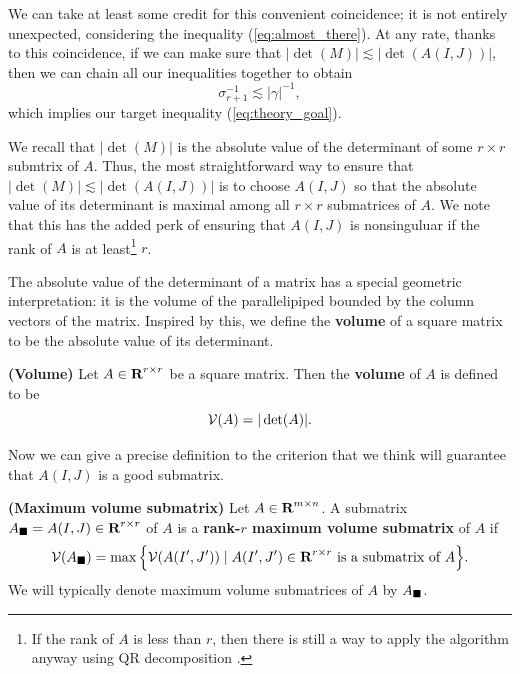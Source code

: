 \documentclass{article}
\begin{document}
	We can take at least some credit for this convenient coincidence; it is not entirely unexpected, considering the inequality (\ref{eq:almost_there}). At any rate, thanks to this coincidence, if we can make sure that $|\det(M)| \lesssim |\det(A(I,J))|$, then we can chain all our inequalities together to obtain
	\begin{equation}
		\sigma_{r+1}^{-1} \lesssim |\gamma|^{-1},
	\end{equation}
	which implies our target inequality (\ref{eq:theory_goal}).
	
	We recall that $|\det(M)|$ is the absolute value of the determinant of some $r\times r$ submtrix of $A$. Thus, the most straightforward way to ensure that $|\det(M)|\lesssim |\det(A(I,J))|$ is to choose $A(I,J)$ so that the absolute value of its determinant is maximal among all $r\times r$ submatrices of $A$.  We note that this has the added perk of ensuring that $A(I,J)$ is nonsinguluar if the rank of $A$ is at least\footnote{If the rank of $A$ is less than $r$, then there is still a way to apply the algorithm anyway using QR decomposition \cite{goreinov_2010}.} $r$.
	
	The absolute value of the determinant of a matrix has a special geometric interpretation: it is the volume of the parallelipiped bounded by the column vectors of the matrix. Inspired by this, we define the \textbf{volume} of a square matrix to be the absolute value of its determinant.
	
	\begin{dfn} \textnormal{\bf(Volume)}
		\label{def:volume}
		Let $A \in \textnormal{\bf R}^{r\times r}$ be a square matrix. Then the \textbf{volume} of $A$ is defined to be
		\begin{equation}
			\mathcal{V}(A) = |\det(A)|.
		\end{equation}
	\end{dfn}
	
	Now we can give a precise definition to the criterion that we think will guarantee that $A(I,J)$ is a good submatrix.
	
	\begin{dfn} \textnormal{\bf(Maximum volume submatrix)}
		\label{def:max_volume_submatrix}
		Let $A \in \textnormal{\bf R}^{m\times n}$. A submatrix $A_\blacksquare = A(I,J) \in \textnormal{\bf R}^{r\times r}$ of $A$ is a \textbf{rank-$r$ maximum volume submatrix} of $A$ if
		\begin{equation}
			\mathcal{V}(A_\blacksquare) = \max\Big\{\mathcal{V}(A(I', J')) \mid A(I',J') \in \textnormal{\bf R}^{r\times r} \textnormal{ is a submatrix of } A\Big\}.
		\end{equation}
		We will typically denote maximum volume submatrices of $A$ by $A_\blacksquare$.
	\end{dfn}
	
\end{document}
